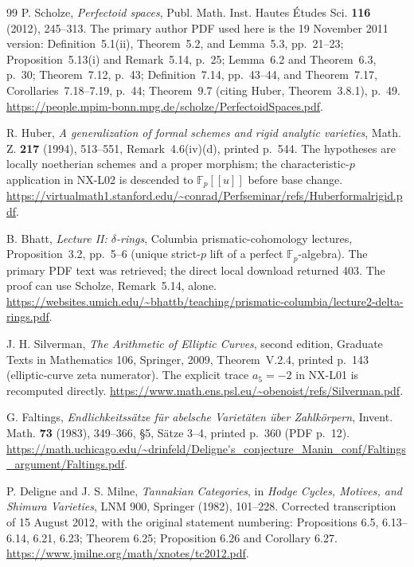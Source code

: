 \documentclass[11pt]{article}
\theoremstyle{remark}
\begin{document}
\begin{thebibliography}{99}
 P. Scholze, \emph{Perfectoid spaces},
Publ. Math. Inst. Hautes \'Etudes Sci. \textbf{116} (2012), 245--313.
The primary author PDF used here is the 19 November 2011 version:
Definition~5.1(ii), Theorem~5.2, and Lemma~5.3, pp.~21--23;
Proposition~5.13(i) and Remark~5.14, p.~25;
Lemma~6.2 and Theorem~6.3, p.~30;
Theorem~7.12, p.~43;
Definition~7.14, pp.~43--44, and Theorem~7.17, Corollaries~7.18--7.19,
p.~44;
Theorem~9.7 (citing Huber, Theorem~3.8.1), p.~49.
\url{https://people.mpim-bonn.mpg.de/scholze/PerfectoidSpaces.pdf}.

 R. Huber, \emph{A generalization of formal schemes and rigid
analytic varieties}, Math. Z. \textbf{217} (1994), 513--551,
Remark~4.6(iv)(d), printed p.~544. The hypotheses are locally noetherian
schemes and a proper morphism; the characteristic-$p$ application in NX-L02
is descended to $\mathbb F_p[[u]]$ before base change.
\url{https://virtualmath1.stanford.edu/~conrad/Perfseminar/refs/Huberformalrigid.pdf}.

 B. Bhatt, \emph{Lecture II: $\delta$-rings},
Columbia prismatic-cohomology lectures, Proposition~3.2, pp.~5--6
(unique strict-$p$ lift of a perfect $\mathbb F_p$-algebra).
The primary PDF text was retrieved; the direct local download returned 403.
The proof can use Scholze, Remark~5.14, alone.
\url{https://websites.umich.edu/~bhattb/teaching/prismatic-columbia/lecture2-delta-rings.pdf}.

 J. H. Silverman, \emph{The Arithmetic of Elliptic Curves},
second edition, Graduate Texts in Mathematics 106, Springer, 2009,
Theorem~V.2.4, printed p.~143 (elliptic-curve zeta numerator).
The explicit trace $a_5=-2$ in NX-L01 is recomputed directly.
\url{https://www.math.ens.psl.eu/~obenoist/refs/Silverman.pdf}.



G. Faltings, \emph{Endlichkeitss\"atze f\"ur abelsche Variet\"aten
\"uber Zahlk\"orpern}, Invent. Math. \textbf{73} (1983), 349--366,
\S5, S\"atze 3--4, printed p.~360 (PDF p.~12).
\url{https://math.uchicago.edu/~drinfeld/Deligne's_conjecture_Manin_conf/Faltings_argument/Faltings.pdf}.

P. Deligne and J. S. Milne, \emph{Tannakian Categories}, in
\emph{Hodge Cycles, Motives, and Shimura Varieties}, LNM 900,
Springer (1982), 101--228.  Corrected transcription of 15 August 2012,
with the original statement numbering: Propositions 6.5, 6.13--6.14,
6.21, 6.23; Theorem 6.25; Proposition 6.26 and Corollary 6.27.
\url{https://www.jmilne.org/math/xnotes/tc2012.pdf}.


\end{thebibliography}
\end{document}
